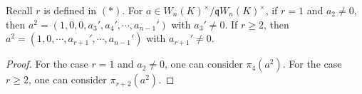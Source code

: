 \documentclass[10pt,a4paper]{amsart}
\begin{document}
\begin{lemma}{\label{312}}
    Recall $r$ is defined in $(*)$. For $a\in W_n(K)^\times/\mathfrak qW_n(K)^\times$, if $r=1$ and $a_2\neq0$, then $a^2=(1,0,0,a_3',a_4',\cdots,a_{n-1}')$ with $a_3'\neq0$. If $r\geq2$, then $a^2=(1,0,\cdots,a_{r+1}',\cdots,a_{n-1}')$  with $a_{r+1}'\neq0$.  %
\end{lemma}

\begin{proof}
For the case $r=1$ and $a_2\neq0$, one can consider $\pi_4(a^2)$. For the case $r\geq2$, one can consider $\pi_{r+2}(a^2)$.
\end{proof}
\end{document}

